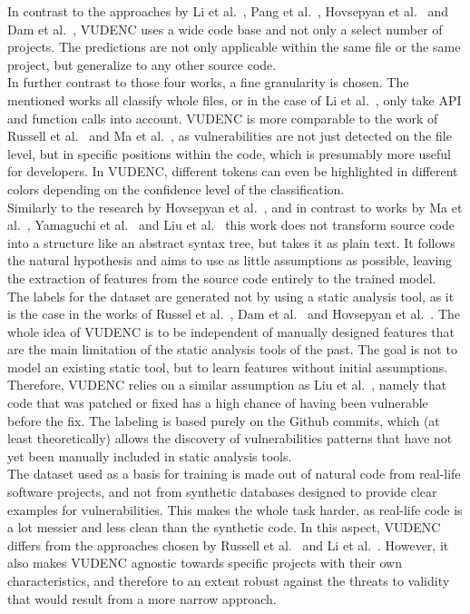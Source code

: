 \documentclass[
a4paper,
pagesize,
pdftex,
12pt,
twoside, %
BCOR=5mm, %
ngerman,
fleqn,
final,
]{scrartcl}
\begin{document}
	In contrast to the approaches by Li et al.~\cite{Li.2018}, Pang et al.~\cite{Pang.2015}, Hovsepyan et al.~\cite{Hovsepyan.2012} and Dam et al.~\cite{Dam.2017}, VUDENC uses a wide code base and not only a select number of projects. The predictions are not only applicable within the same file or the same project, but generalize to any other source code.\\
	In further contrast to those four works, a fine granularity is chosen. The mentioned works all classify whole files, or in the case of Li et al.~\cite{Li.2018}, only take API and function calls into account. VUDENC is more comparable to the work of Russell et al.~\cite{Russell.2018} and Ma et al.~\cite{Ma.2017}, as vulnerabilities are not just detected on the file level, but in specific positions within the code, which is presumably more useful for developers. In VUDENC, different tokens can even be highlighted in different colors depending on the confidence level of the classification.\\
	Similarly to the research by Hovsepyan et al.~\cite{Hovsepyan.2012}, and in contrast to works by Ma et al.~\cite{Ma.2017}, Yamaguchi et al.~\cite{Yamaguchi.2012} and Liu et al.~\cite{Liu.2018}
	this work does not transform source code into a structure like an abstract syntax tree, but takes it as plain text. It follows the natural hypothesis and aims to use as little assumptions as possible, leaving the extraction of features from the source code entirely to the trained model.\\
	The labels for the dataset are generated not by using a static analysis tool, as it is the case in the works of Russel et al.~\cite{Russell.2018}, Dam et al.~\cite{Dam.2017} and Hovsepyan et al.~\cite{Hovsepyan.2012}. The whole idea of VUDENC is to be independent of manually designed features that are the main limitation of the static analysis tools of the past. The goal is not to model an existing static tool, but to learn features without initial assumptions. Therefore, VUDENC relies on a similar assumption as Liu et al.~\cite{Liu.2018}, namely that code that was patched or fixed has a high chance of having been vulnerable before the fix. The labeling is based purely on the Github commits, which (at least theoretically) allows the discovery of vulnerabilities patterns that have not yet been manually included in static analysis tools.\\
	The dataset used as a basis for training is made out of natural code from real-life software projects, and not from synthetic databases designed to provide clear examples for vulnerabilities. This makes the whole task harder, as real-life code is a lot messier and less clean than the synthetic code. In this aspect, VUDENC differs from the approaches chosen by Russell et al.~\cite{Russell.2018} and Li et al.~\cite{Li.2018}. However, it also makes VUDENC agnostic towards specific projects with their own characteristics, and therefore to an extent robust against the threats to validity that would result from a more narrow approach.\\
\end{document}
